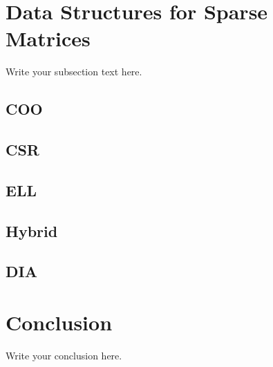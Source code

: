 \documentclass{article}
\begin{document}
\section{Data Structures for Sparse Matrices}
Write your subsection text here.

\subsection{COO}

\subsection{CSR}

\subsection{ELL}

\subsection{Hybrid}

\subsection{DIA}


\section{Conclusion}
Write your conclusion here.
\end{document}
